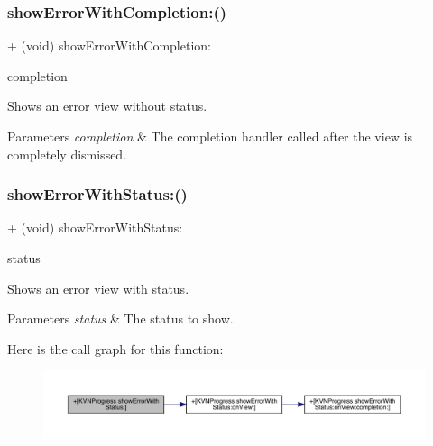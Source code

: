\subsubsection{\texorpdfstring{show\+Error\+With\+Completion\+:()}{showErrorWithCompletion:()}\hspace{0.1cm}{\footnotesize\ttfamily [3/3]}}
{\footnotesize\ttfamily + (void) show\+Error\+With\+Completion\+: \begin{DoxyParamCaption}\item[{(K\+V\+N\+Completion\+Block)}]{completion }\end{DoxyParamCaption}}

Shows an error view without status. 
\begin{DoxyParams}{Parameters}
{\em completion} & The completion handler called after the view is completely dismissed. \\
\hline
\end{DoxyParams}
\mbox{\label{interface_k_v_n_progress_a3125f228cdd6685e4cf74fa960bfa234}} 
\subsubsection{\texorpdfstring{show\+Error\+With\+Status\+:()}{showErrorWithStatus:()}\hspace{0.1cm}{\footnotesize\ttfamily [1/3]}}
{\footnotesize\ttfamily + (void) show\+Error\+With\+Status\+: \begin{DoxyParamCaption}\item[{(N\+S\+String $\ast$)}]{status }\end{DoxyParamCaption}}

Shows an error view with {\ttfamily status}. 
\begin{DoxyParams}{Parameters}
{\em status} & The status to show. \\
\hline
\end{DoxyParams}
Here is the call graph for this function\+:\nopagebreak
\begin{figure}[H]
\begin{center}
\leavevmode
\includegraphics[width=350pt]{interface_k_v_n_progress_a3125f228cdd6685e4cf74fa960bfa234_cgraph}
\end{center}
\end{figure}
\mbox{\label{interface_k_v_n_progress_a3125f228cdd6685e4cf74fa960bfa234}} 
